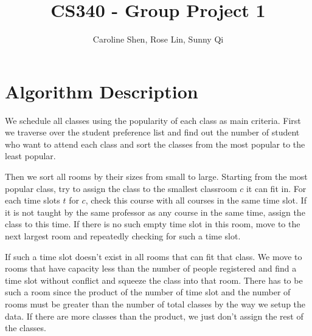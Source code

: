 \documentclass[11pt, oneside]{article}   	%
\title{CS340 - Group Project 1}
\author{Caroline Shen, Rose Lin, Sunny Qi}
\date{}							%
\begin{document}
\maketitle


\section{Algorithm Description}
We schedule all classes using the popularity of each class as main criteria. First we traverse over the student preference list and find out the number of student who want to attend each class and sort the classes from the most popular to the least popular. 

Then we sort all rooms by their sizes from small to large. Starting from the most popular class, try to assign the class to the smallest classroom $c$ it can fit in. For each time slots $t$ for $c$, check this course with all courses in the same time slot. If it is not taught by the same professor as any course in the same time, assign the class to this time. If there is no such empty time slot in this room, move to the next largest room and repeatedly checking for such a time slot. 

If such a time slot doesn't exist in all rooms that can fit that class. We move to rooms that have capacity less than the number of people registered and find a time slot without conflict and squeeze the class into that room. There has to be such a room since the product of the number of time slot and the number of rooms must be greater than the number of total classes by the way we setup the data. If there are more classes than the product, we just don't assign the rest of the classes.

\section{}
\begin{algorithm}[H]
\end{algorithm}
\end{document}
